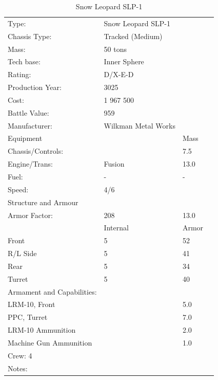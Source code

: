 \documentclass{tufte-book}
\begin{document}
\bigskip
\begin{table}
\begin{minipage}{\textwidth}
\begin{center}
\begin{tabular}{llll}
\toprule
Type: & Snow Leopard SLP-1 & \\
Chassis Type: & Tracked (Medium) & \\
Mass: & 50 tons & \\
Tech base: & Inner Sphere & \\
Rating: & D/X-E-D & \\
Production Year: & 3025 & \\
Cost: & 1 967 500 & \\
Battle Value: & 959 & \\
Manufacturer: & Wilkman Metal Works & \\
Equipment & & Mass \\
\quad Chassis/Controls: & & 7.5 \\
\quad Engine/Trans: & Fusion & 13.0 \\
\quad Fuel: & - & - \\
\quad Speed: & \multicolumn{2}{l}{4/6} \\
Structure and Armour & & \\
\quad Armor Factor: & 208 & 13.0 \\
\quad & Internal & Armor \\
\quad Front & 5 & 52 \\
\quad R/L Side & 5 & 41 \\
\quad Rear & 5 & 34 \\
\quad Turret & 5 & 40 \\

Armament and Capabilities: & & \\
\multicolumn{2}{l}{\quad LRM-10, Front} & 5.0 \\
\multicolumn{2}{l}{\quad PPC, Turret} & 7.0 \\
\multicolumn{2}{l}{\quad LRM-10 Ammunition} & 2.0 \\
\multicolumn{2}{l}{\quad Machine Gun Ammunition} & 1.0 \\


\multicolumn{3}{l}{Crew: 4} \\

Notes: & & \\


\bottomrule
\end{tabular}
\end{center}
\end{minipage}
\caption{Snow Leopard SLP-1}
\end{table}
\end{document}
